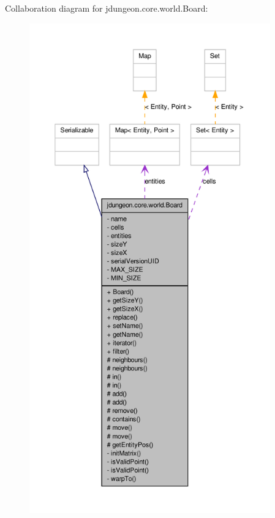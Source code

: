 Collaboration diagram for jdungeon.core.world.Board:
\nopagebreak
\begin{figure}[H]
\begin{center}
\leavevmode
\includegraphics[height=600pt]{classjdungeon_1_1core_1_1world_1_1_board__coll__graph}
\end{center}
\end{figure}
